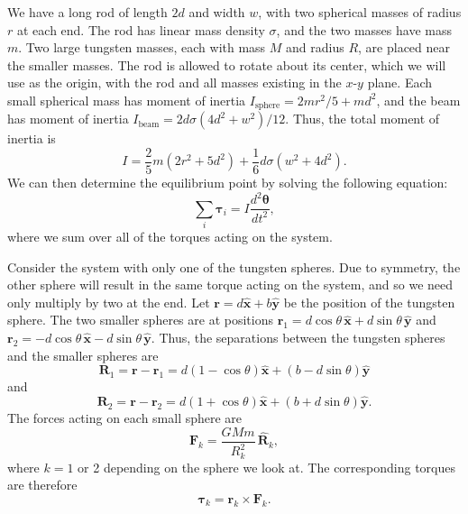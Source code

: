 \documentclass[aps, reprint,amsmath,amssymb]{revtex4-1} %
\renewcommand{\vec}[1]{\boldsymbol{#1}}
\newcommand{\uv}[1]{\vec{\hat{#1}}}
\newcommand{\x}{\vec{\hat{x}}}
\newcommand{\y}{\vec{\hat{y}}}
\begin{document}
We have a long rod of length $2d$ and width $w$, with two spherical masses
of radius $r$ at each end.  The rod has linear mass density $\sigma$, and
the two masses have mass $m$. Two large tungsten masses, each with mass $M$
and radius $R$, are placed near the smaller masses. The rod is allowed
to rotate about its center, which we will use as the origin, with the rod
and all masses existing in the $x$-$y$ plane. Each small spherical mass has
moment of inertia $I_\text{sphere} = 2mr^2/5 + md^2$, and the beam has
moment of inertia $I_\text{beam} = 2d\sigma(4d^2 + w^2)/12$. Thus, the
total moment of inertia is
\begin{equation}
    \label{eq:moment_of_inertia}
    I = \frac{2}{5} m (2 r^2 + 5 d^2) + \frac{1}{6}d\sigma(w^2 + 4d^2).
\end{equation}
We can then determine the equilibrium point by solving the following
equation:
\begin{equation}
    \sum_i \vec{\tau}_i = I \frac{d^2\vec{\theta}}{dt^2},
\end{equation}
where we sum over all of the torques acting on the system. 

Consider the system with only one of the tungsten spheres. Due to symmetry,
the other sphere will result in the same torque acting on the system, and
so we need only multiply by two at the end. Let $\vec{r} = d\x + b\y$ be the
position of the tungsten sphere. The two smaller spheres are at positions
$\vec{r}_1 = d \cos\theta\,\x + d \sin \theta \, \y$ and $\vec{r}_2 = -d
\cos \theta\,\x - d \sin \theta \, \y$. Thus, the separations between the
tungsten spheres and the smaller spheres are
\[
    \vec{R}_1 = \vec{r} - \vec{r}_1 = d(1 - \cos\theta)\x + (b -
    d\sin\theta) \y
\]
and
\[
    \vec{R}_2 = \vec{r} - \vec{r}_2 = d(1 + \cos\theta)\x + (b + d \sin
    \theta) \y.
\]
The forces acting on each small sphere are
\begin{equation}
    \label{eq:forces}
    \vec{F}_k = \frac{G M m}{R_k^2}\,\uv{R}_k,
\end{equation}
where $k = 1$ or 2 depending on the sphere we look at. The corresponding
torques are therefore
\begin{equation}
    \label{eq:torques}
    \vec{\tau}_k = \vec{r}_k \times \vec{F}_k.
\end{equation}
\end{document}
